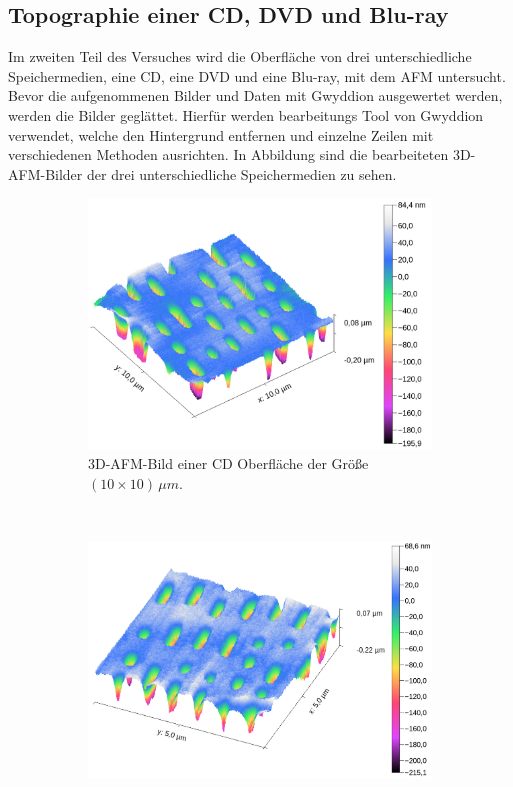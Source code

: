 \subsection{Topographie einer CD, DVD und Blu-ray}
Im zweiten Teil des Versuches wird die Oberfl\"ache von drei unterschiedliche Speichermedien, eine CD, eine DVD und eine Blu-ray, mit dem AFM untersucht.
Bevor die aufgenommenen Bilder und Daten mit Gwyddion ausgewertet werden, werden die Bilder gegl\"attet.
Hierf\"ur werden bearbeitungs Tool von Gwyddion verwendet, welche den Hintergrund entfernen und einzelne Zeilen mit verschiedenen Methoden ausrichten.
In Abbildung sind die bearbeiteten 3D-AFM-Bilder der drei unterschiedliche Speichermedien zu sehen.
\begin{figure}[H]
\centering
	\begin{subfigure}[t]{0.45\textwidth}
	\includegraphics[width=\textwidth]{AFM_auswertung/cd_3D.png}
	\caption{3D-AFM-Bild einer CD Oberfl\"ache der Gr\"o{\ss}e $(10 \times 10) \, \mu m$.}
	\label{abb:cd_3d}
	\end{subfigure}
	~
	\begin{subfigure}[t]{0.45\textwidth}
	\includegraphics[width=\textwidth]{AFM_auswertung/dvd_3d.png}

\end{subfigure}
\end{figure}
